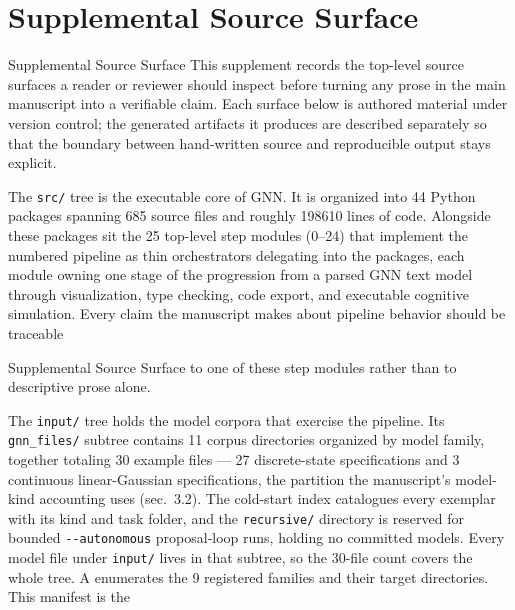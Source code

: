 \documentclass[
  ignorenonframetext,
]{beamer}
\author{\texorpdfstring{}{}}
\date{}
\begin{document}
\section{Supplemental Source Surface}\label{sec:source_surface}

\begin{frame}{Supplemental Source Surface}
This supplement records the top-level source surfaces a reader or
reviewer should inspect before turning any prose in the main manuscript
into a verifiable claim. Each surface below is authored material under
version control; the generated artifacts it produces are described
separately so that the boundary between hand-written source and
reproducible output stays explicit.

The \texttt{src/} tree is the executable core of GNN. It is organized
into 44 Python packages spanning 685 source files and roughly 198610
lines of code. Alongside these packages sit the 25 top-level step
modules (0--24) that implement the numbered pipeline as thin
orchestrators delegating into the packages, each module owning one stage
of the progression from a parsed GNN text model through visualization,
type checking, code export, and executable cognitive simulation. Every
claim the manuscript makes about pipeline behavior should be traceable
\end{frame}

\begin{frame}{Supplemental Source Surface}
to one of these step modules rather than to descriptive prose alone.

The \texttt{input/} tree holds the model corpora that exercise the
pipeline. Its \texttt{gnn\_files/} subtree contains 11 corpus
directories organized by model family, together totaling 30 example
files --- 27 discrete-state specifications and 3 continuous
linear-Gaussian specifications, the partition the manuscript's
model-kind accounting uses (sec.~3.2). The cold-start
index  catalogues every exemplar with
its kind and task folder, and the \texttt{recursive/} directory is
reserved for bounded \texttt{-\/-autonomous} proposal-loop runs, holding
no committed models. Every model file under \texttt{input/} lives in
that subtree, so the 30-file count covers the whole tree. A
 enumerates the 9 registered
families and their target directories. This manifest is the
\end{frame}
\end{document}
